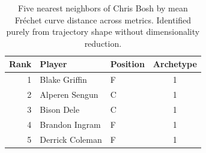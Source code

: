 \begin{table}[htbp]
  \centering\small
  \begin{tabular}{rllc}
    \toprule
    Rank & Player & Position & Archetype \\
    \midrule
    1 & Blake Griffin & F & 1 \\
    2 & Alperen Sengun & C & 1 \\
    3 & Bison Dele & C & 1 \\
    4 & Brandon Ingram & F & 1 \\
    5 & Derrick Coleman & F & 1 \\
    \bottomrule
  \end{tabular}
  \caption{Five nearest neighbors of Chris Bosh by mean Fr\'{e}chet curve distance across metrics. Identified purely from trajectory shape without dimensionality reduction.}
  \label{tab:Chris_Bosh_frechet_curve_neighbors}
\end{table}

